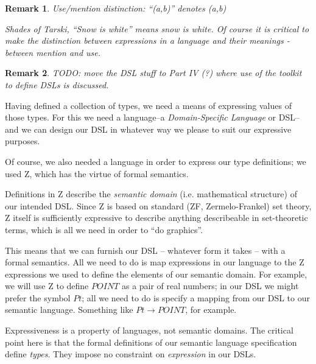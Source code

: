 \documentclass[12pt]{tufte-handout}
\numberwithin{equation}{subsection}
\numberwithin{equation}{subsection}
\newtheorem{remark}{Remark}
\begin{document}
\begin{remark}
  Use/mention distinction: ``(a,b)'' denotes (a,b)

  Shades of Tarski, ``Snow is white'' means snow is white.  Of course
  it is critical to make the distinction between expressions in a
  language and their meanings - between mention and use.
\end{remark}

\begin{remark}
  TODO: move the DSL stuff to Part IV (?) where use of the toolkit to
  define DSLs is discussed.
\end{remark}

Having defined a collection of types, we need a means of expressing
values of those types.  For this we need a language--a
\textit{Domain-Specific Language} or DSL--and we can design our DSL in
whatever way we please to suit our expressive purposes.

Of course, we also needed a language in order to express our type
definitions; we used Z, which has the virtue of formal semantics.

Definitions in Z describe the \textit{semantic domain}
(i.e. mathematical structure) of our intended DSL.  Since Z is based
on standard (ZF, Zermelo-Frankel) set theory, Z itself is sufficiently
expressive to describe anything describeable in set-theoretic terms,
which is all we need in order to ``do graphics''.

This means that we can furnish our DSL -- whatever form it takes --
with a formal semantics.  All we need to do is map expressions in our
language to the Z expressions we used to define the elements of our
semantic domain.  For example, we will use Z to define \(POINT\) as a
pair of real numbers; in our DSL we might prefer the symbol \(Pt\);
all we need to do is specify a mapping from our DSL to our semantic
language. Something like \(Pt\rightarrow POINT\), for
example.

Expressiveness is a property of languages, not semantic domains.  The
critical point here is that the formal definitions of our semantic
language specification define \textit{types}.  They impose no
constraint on \textit{expression} in our DSLs.
\end{document}
